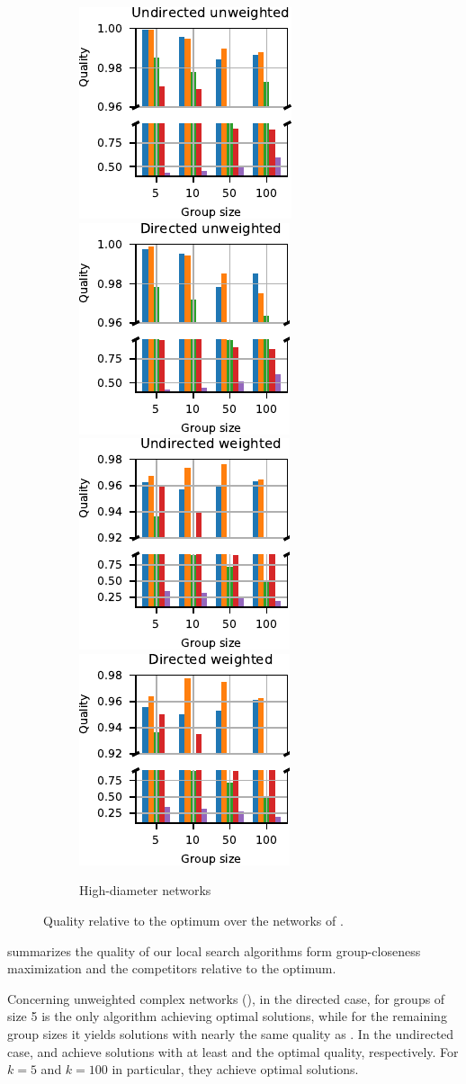 \begin{figure}[tb]
\begin{subfigure}[t]{\textwidth}
\centering
\includegraphics[width=.24\textwidth]{./sources/plots/gh-gc-apx/quality-ilp-high-diameter-undirected-unweighted.pdf}
\includegraphics[width=.24\textwidth]{./sources/plots/gh-gc-apx/quality-ilp-high-diameter-directed-unweighted.pdf}
\includegraphics[width=.24\textwidth]{./sources/plots/gh-gc-apx/quality-ilp-high-diameter-undirected-weighted.pdf}
\includegraphics[width=.24\textwidth]{./sources/plots/gh-gc-apx/quality-ilp-high-diameter-directed-weighted.pdf}
\caption{High-diameter networks}
\label{fig:gh-gc-apx:qual-vs-opt-gc-high-diam}
\end{subfigure}

\caption{Quality relative to the optimum over the networks of
.}
\label{fig:gh-gc-apx:qual-vs-opt-gc}
\end{figure}


 summarizes the quality of our local search algorithms
form group-closeness maximization and the competitors relative to the optimum.

Concerning unweighted complex networks (),
in the directed case, for groups of size 5 \greedylsc is the only algorithm achieving
optimal solutions, while for the remaining group sizes it yields solutions with nearly
the same quality as \greedyc. In the undirected case, \greedylsc and \gslsc achieve
solutions with at least \minQualLSGRCplxUnw
and \minQualLSGSCplxUnw the optimal quality, respectively. For $k = 5$ and $k =
100$ in particular, they achieve optimal solutions.

